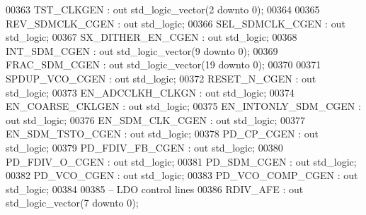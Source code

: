 \begin{DoxyCode}
00363         TST\_CLKGEN                  : \textcolor{keywordflow}{out} \textcolor{comment}{std\_logic\_vector}(\textcolor{vhdllogic}{}\textcolor{vhdllogic}{2} \textcolor{keywordflow}{downto} \textcolor{vhdllogic}{}\textcolor{vhdllogic}{0});
00364 
00365         REV\_SDMCLK\_CGEN         : \textcolor{keywordflow}{out} \textcolor{comment}{std\_logic};
00366         SEL\_SDMCLK\_CGEN         : \textcolor{keywordflow}{out} \textcolor{comment}{std\_logic};
00367         SX\_DITHER\_EN\_CGEN       : \textcolor{keywordflow}{out} \textcolor{comment}{std\_logic};
00368         INT\_SDM\_CGEN                : \textcolor{keywordflow}{out} \textcolor{comment}{std\_logic\_vector}(\textcolor{vhdllogic}{}\textcolor{vhdllogic}{9} \textcolor{keywordflow}{downto} \textcolor{vhdllogic}{}\textcolor{vhdllogic}{0});
00369         FRAC\_SDM\_CGEN               : \textcolor{keywordflow}{out} \textcolor{comment}{std\_logic\_vector}(\textcolor{vhdllogic}{}\textcolor{vhdllogic}{19} \textcolor{keywordflow}{downto} \textcolor{vhdllogic}{}\textcolor{vhdllogic}{0});
00370 
00371         SPDUP\_VCO\_CGEN          : \textcolor{keywordflow}{out} \textcolor{comment}{std\_logic};
00372         RESET\_N\_CGEN                : \textcolor{keywordflow}{out} \textcolor{comment}{std\_logic};
00373         EN\_ADCCLKH\_CLKGN        : \textcolor{keywordflow}{out} \textcolor{comment}{std\_logic};
00374         EN\_COARSE\_CKLGEN        : \textcolor{keywordflow}{out} \textcolor{comment}{std\_logic};
00375         EN\_INTONLY\_SDM\_CGEN : \textcolor{keywordflow}{out} \textcolor{comment}{std\_logic};
00376         EN\_SDM\_CLK\_CGEN         : \textcolor{keywordflow}{out} \textcolor{comment}{std\_logic};
00377         EN\_SDM\_TSTO\_CGEN        : \textcolor{keywordflow}{out} \textcolor{comment}{std\_logic};
00378         PD\_CP\_CGEN                  : \textcolor{keywordflow}{out} \textcolor{comment}{std\_logic};
00379         PD\_FDIV\_FB\_CGEN         : \textcolor{keywordflow}{out} \textcolor{comment}{std\_logic};
00380         PD\_FDIV\_O\_CGEN          : \textcolor{keywordflow}{out} \textcolor{comment}{std\_logic};
00381         PD\_SDM\_CGEN                 : \textcolor{keywordflow}{out} \textcolor{comment}{std\_logic};
00382         PD\_VCO\_CGEN                 : \textcolor{keywordflow}{out} \textcolor{comment}{std\_logic};
00383         PD\_VCO\_COMP\_CGEN        : \textcolor{keywordflow}{out} \textcolor{comment}{std\_logic};
00384         
00385 \textcolor{keyword}{        -- LDO control lines    }
00386         RDIV\_AFE            : \textcolor{keywordflow}{out} \textcolor{comment}{std\_logic\_vector}(\textcolor{vhdllogic}{}\textcolor{vhdllogic}{7} \textcolor{keywordflow}{downto} \textcolor{vhdllogic}{}\textcolor{vhdllogic}{0});

\end{DoxyCode}
